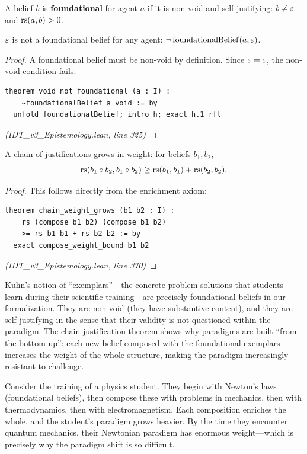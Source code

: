 \begin{definition}
\label{def:foundational-belief}
A belief $b$ is \textbf{foundational} for agent $a$ if it is non-void and
self-justifying: $b \neq \varepsilon$ and $\mathrm{rs}(a, b) > 0$.
\end{definition}

\begin{theorem}
\label{thm:void-not-foundational}
$\varepsilon$ is not a foundational belief for any agent: $\neg\,\mathrm{foundationalBelief}(a, \varepsilon)$.
\end{theorem}

\begin{proof}
A foundational belief must be non-void by definition. Since $\varepsilon = \varepsilon$,
the non-void condition fails.
\begin{lstlisting}
theorem void_not_foundational (a : I) :
    ~foundationalBelief a void := by
  unfold foundationalBelief; intro h; exact h.1 rfl
\end{lstlisting}
\textit{(IDT\_v3\_Epistemology.lean, line 325)}
\end{proof}

\begin{theorem}
\label{thm:chain-weight-grows}
A chain of justifications grows in weight: for beliefs $b_1, b_2$,
\[
  \mathrm{rs}(b_1 \circ b_2, b_1 \circ b_2) \geq \mathrm{rs}(b_1, b_1) + \mathrm{rs}(b_2, b_2).
\]
\end{theorem}

\begin{proof}
This follows directly from the enrichment axiom:
\begin{lstlisting}
theorem chain_weight_grows (b1 b2 : I) :
    rs (compose b1 b2) (compose b1 b2)
    >= rs b1 b1 + rs b2 b2 := by
  exact compose_weight_bound b1 b2
\end{lstlisting}
\textit{(IDT\_v3\_Epistemology.lean, line 370)}
\end{proof}

\begin{interpretation}
Kuhn's notion of ``exemplars''---the concrete problem-solutions that students
learn during their scientific training---are precisely foundational beliefs in
our formalization. They are non-void (they have substantive content), and they
are self-justifying in the sense that their validity is not questioned within
the paradigm. The chain justification theorem shows why paradigms are built
``from the bottom up'': each new belief composed with the foundational exemplars
increases the weight of the whole structure, making the paradigm increasingly
resistant to challenge.

Consider the training of a physics student. They begin with Newton's laws
(foundational beliefs), then compose these with problems in mechanics, then
with thermodynamics, then with electromagnetism. Each composition enriches the
whole, and the student's paradigm grows heavier. By the time they encounter
quantum mechanics, their Newtonian paradigm has enormous weight---which is
precisely why the paradigm shift is so difficult.
\end{interpretation}

